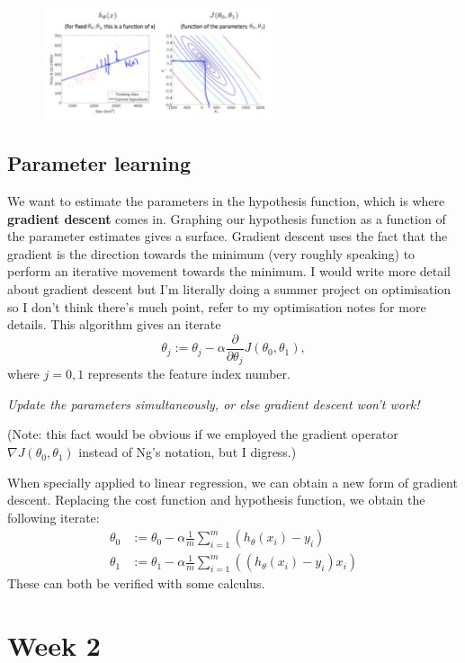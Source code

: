 \documentclass[a4paper, 12pt, oneside]{scrartcl}
\begin{document}
\begin{figure}[H]
\centering
\includegraphics[width=0.6\textwidth]{figures/contour.png}
\end{figure}

\subsection{Parameter learning}

We want to estimate the parameters in the hypothesis function, which is where \textbf{gradient descent} comes in. Graphing our hypothesis function as a function of the parameter estimates gives a surface. Gradient descent uses the fact that the gradient is the direction towards the minimum (very roughly speaking) to perform an iterative movement towards the minimum. I would write more detail about gradient descent but I'm literally doing a summer project on optimisation so I don't think there's much point, refer to my optimisation notes for more details. This algorithm gives an iterate
\[\theta_j := \theta_j - \alpha \frac{\partial}{\partial \theta_j} J(\theta_0, \theta_1),\]
where $j=0,1$ represents the feature index number.
\begin{center}
    \textit{Update the parameters simultaneously, or else gradient descent won't work!}
\end{center}
(Note: this fact would be obvious if we employed the gradient operator $\nabla J(\theta_0, \theta_1)$ instead of Ng's notation, but I digress.)

When specially applied to linear regression, we can obtain a new form of gradient descent. Replacing the cost function and hypothesis function, we obtain the following iterate:
\begin{align*}
    \theta_0 &:= \theta_0 - \alpha \frac1m \sum_{i=1}^m (h_\theta(x_i) - y_i) \\
    \theta_1 &:= \theta_1 - \alpha \frac1m \sum_{i=1}^m ((h_\theta(x_i) - y_i)x_i)
\end{align*}
These can both be verified with some calculus.

\section{Week 2}
\end{document}
